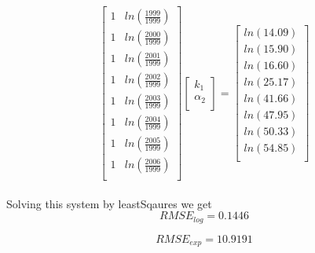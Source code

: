 \documentclass[unicode,11pt,a4paper,oneside,numbers=endperiod,openany]{scrartcl}
\begin{document}
\begin{itemize}
	\[
        \begin{bmatrix}
        1 & ln(\frac{1999}{1999}) \\
        1 & ln(\frac{2000}{1999}) \\
     	1 & ln(\frac{2001}{1999}) \\
        1 & ln(\frac{2002}{1999}) \\
        1 & ln(\frac{2003}{1999}) \\
        1 & ln(\frac{2004}{1999}) \\
        1 & ln(\frac{2005}{1999}) \\
        1 & ln(\frac{2006}{1999}) \\
        \end{bmatrix}
        \begin{bmatrix}
        k_1 \\ \alpha_2 \\
        \end{bmatrix}
        =
        \begin{bmatrix}
        ln(14.09) \\
        ln(15.90) \\
     	ln(16.60) \\
        ln(25.17) \\
        ln(41.66) \\
        ln(47.95) \\
        ln(50.33) \\
        ln(54.85) \\
        \end{bmatrix}
    \]
    \\
    {Solving this system by leastSqaures we get}\\
	
	\begin{equation}
	RMSE_{log} = 0.1446
	\end{equation}
	
	\begin{equation}
	RMSE_{exp} = 10.9191
	\end{equation}
	
	
	

\end{itemize}
\end{document}

